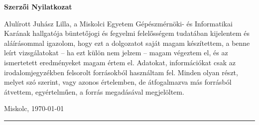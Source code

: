 \documentclass[11pt, a4paper, oneside]{Thesis} %
\begin{document}
\thispagestyle{empty}
{}
\begin{center}{\huge\bf Szerzői Nyilatkozat\par}\end{center}


Alulírott Juhász Lilla, a Miskolci Egyetem Gépészmérnöki- és Informatikai Karának hallgatója büntetőjogi és fegyelmi felelősségem tudatában kijelentem és aláírásommal igazolom, hogy ezt a dolgozatot saját magam készítettem, a benne leírt vizsgálatokat – ha ezt külön nem jelzem – magam végeztem el, és az ismertetett eredményeket magam értem el. Adatokat, információkat csak az irodalomjegyzékben felsorolt forrásokból használtam fel. Minden olyan részt, melyet szó szerint, vagy azonos értelemben, de átfogalmazva más forrásból átvettem, egyértelműen, a forrás megadásával megjelöltem.\bigskip

Miskolc, \today \\

\vspace{2cm}
\begin{minipage}{0.4\textwidth}
\begin{center}
\rule{5cm}{0.5mm} \\
\authornames
\end{center}
\end{minipage}

\clearpage %

\tableofcontents
\newpage










\appendix


\end{document}
